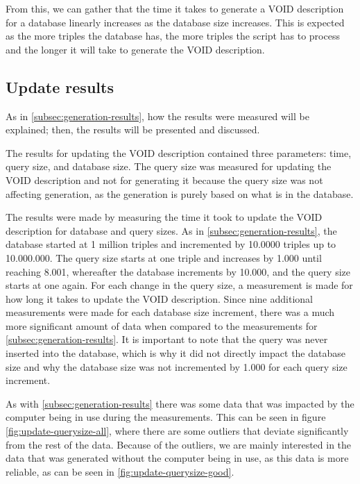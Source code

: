 From this, we can gather that the time it takes to generate a VOID description for a database linearly increases as the database size increases. This is expected as the more triples the database has, the more triples the script has to process and the longer it will take to generate the VOID description.


\subsection{Update results}\label{subsec:update-results}
As in \autoref{subsec:generation-results}, how the results were measured will be explained; then, the results will be presented and discussed.

The results for updating the VOID description contained three parameters: time, query size, and database size. The query size was measured for updating the VOID description and not for generating it because the query size was not affecting generation, as the generation is purely based on what is in the database.

The results were made by measuring the time it took to update the VOID description for database and query sizes. As in \autoref{subsec:generation-results}, the database started at 1 million triples and incremented by 10.0000 triples up to 10.000.000. The query size starts at one triple and increases by 1.000 until reaching 8.001, whereafter the database increments by 10.000, and the query size starts at one again. For each change in the query size, a measurement is made for how long it takes to update the VOID description. Since nine additional measurements were made for each database size increment, there was a much more significant amount of data when compared to the measurements for \autoref{subsec:generation-results}. It is important to note that the query was never inserted into the database, which is why it did not directly impact the database size and why the database size was not incremented by 1.000 for each query size increment.

As with \autoref{subsec:generation-results} there was some data that was impacted by the computer being in use during the measurements. This can be seen in figure \autoref{fig:update-querysize-all}, where there are some outliers that deviate significantly from the rest of the data. Because of the outliers, we are mainly interested in the data that was generated without the computer being in use, as this data is more reliable, as can be seen in \autoref{fig:update-querysize-good}.

